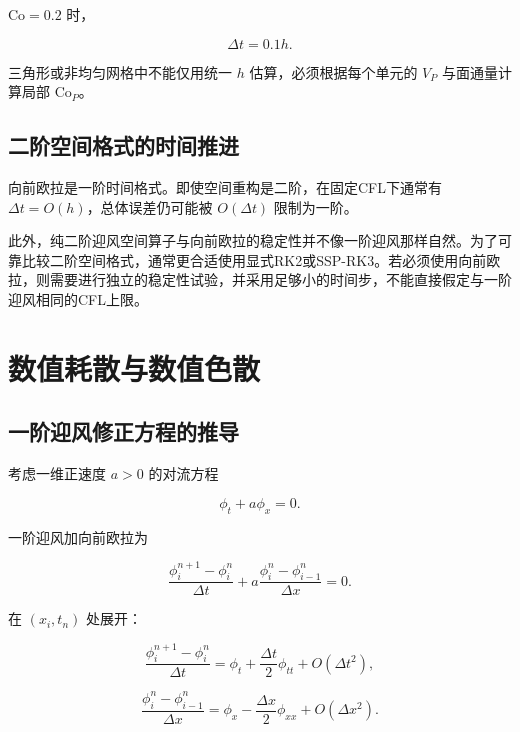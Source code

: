 \documentclass[UTF8,12pt,a4paper,fontset=fandol]{ctexart}
\numberwithin{equation}{section}
\newcommand{\Co}{\mathrm{Co}}
\begin{document}
$\Co=0.2$ 时，

\begin{equation}
  \Delta t=0.1h.
\end{equation}

三角形或非均匀网格中不能仅用统一 $h$ 估算，必须根据每个单元的 $V_P$ 与面通量计算局部 $\Co_P$。

\subsection{二阶空间格式的时间推进}

向前欧拉是一阶时间格式。即使空间重构是二阶，在固定CFL下通常有 $\Delta t=O(h)$，总体误差仍可能被 $O(\Delta t)$ 限制为一阶。

此外，纯二阶迎风空间算子与向前欧拉的稳定性并不像一阶迎风那样自然。为了可靠比较二阶空间格式，通常更合适使用显式RK2或SSP-RK3。若必须使用向前欧拉，则需要进行独立的稳定性试验，并采用足够小的时间步，不能直接假定与一阶迎风相同的CFL上限。

\section{数值耗散与数值色散}

\subsection{一阶迎风修正方程的推导}

考虑一维正速度 $a>0$ 的对流方程

\begin{equation}
  \phi_t+a\phi_x=0.
\end{equation}

一阶迎风加向前欧拉为

\begin{equation}
  \frac{\phi_i^{n+1}-\phi_i^n}{\Delta t}
  +
  a\frac{\phi_i^n-\phi_{i-1}^n}{\Delta x}
  =0.
  \label{eq:ftbs}
\end{equation}

在 $(x_i,t_n)$ 处展开：

\begin{equation}
  \frac{\phi_i^{n+1}-\phi_i^n}{\Delta t}
  =
  \phi_t
  +\frac{\Delta t}{2}\phi_{tt}
  +O(\Delta t^2),
\end{equation}

\begin{equation}
  \frac{\phi_i^n-\phi_{i-1}^n}{\Delta x}
  =
  \phi_x
  -\frac{\Delta x}{2}\phi_{xx}
  +O(\Delta x^2).
\end{equation}
\end{document}
